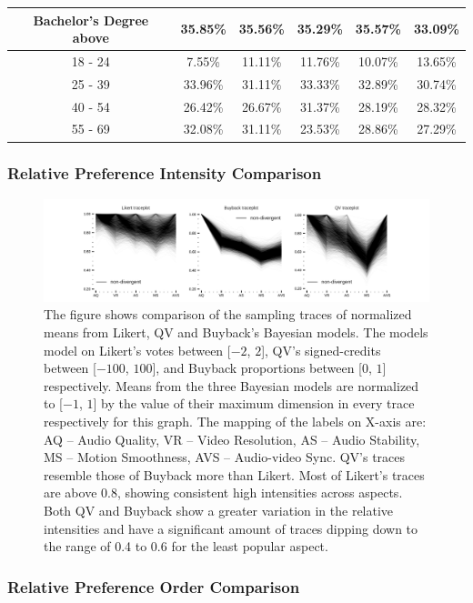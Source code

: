 \begin{table}
\begin{tabular}{|c|cccc|c|}
    Bachelor's Degree above & 35.85\% & 35.56\% & 35.29\% & 35.57\% & 33.09\% \\ 
    \hline
    18 - 24 & 7.55\% & 11.11\% & 11.76\% & 10.07\% & 13.65\% \\
    25 - 39 & 33.96\% & 31.11\% & 33.33\% & 32.89\% & 30.74\% \\
    40 - 54 & 26.42\% & 26.67\% & 31.37\% & 28.19\% & 28.32\% \\
    55 - 69 & 32.08\% & 31.11\% & 23.53\% & 28.86\% & 27.29\% \\
    \hline
    \end{tabular}
    \vspace{-10px} %
\end{table}


\subsubsection{Relative Preference Intensity Comparison}

\begin{figure}[htpb]
  \centering
  \includegraphics[trim= 1.5in 0in 1.5in 0in, clip, width=\textwidth, keepaspectratio=true]{"content/image/exp2_2_means_traceplot.pdf"}
  \caption{
    The figure shows comparison of the sampling traces of normalized means from Likert, QV and Buyback's Bayesian models. The models model on Likert's votes between [$-2$, $2$], QV's signed-credits between [$-100$, $100$], and Buyback proportions between [$0$, $1$] respectively. Means from the three Bayesian models are normalized to [$-1$, $1$] by the value of their maximum dimension in every trace respectively for this graph. The mapping of the labels on X-axis are: AQ -- Audio Quality, VR -- Video Resolution, AS -- Audio Stability, MS -- Motion Smoothness, AVS -- Audio-video Sync. QV's traces resemble those of Buyback more than Likert. Most of Likert's traces are above 0.8, showing consistent high intensities across aspects. Both QV and Buyback show a greater variation in the relative intensities and have a significant amount of traces dipping down to the range of 0.4 to 0.6 for the least popular aspect.
  }
  \label{fig:means_exp2}
\end{figure}

\subsubsection{Relative Preference Order Comparison}